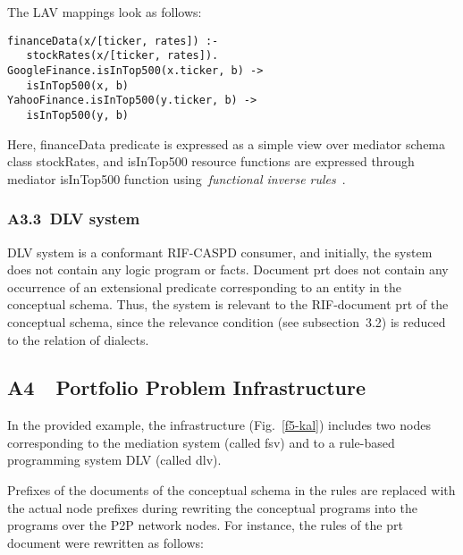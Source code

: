 \begin{multicols}{2}
{The  LAV mappings look as follows:
}



\noindent
{\small
  \begin{verbatim}
financeData(x/[ticker, rates]) :- 
   stockRates(x/[ticker, rates]).
GoogleFinance.isInTop500(x.ticker, b) -> 
   isInTop500(x, b)
YahooFinance.isInTop500(y.ticker, b) -> 
   isInTop500(y, b)
\end{verbatim}
}



{\small

\noindent
  Here, {\sf financeData} predicate is expressed as a simple view over mediator
schema class {\sf stockRates}, and {\sf isInTop500} resource functions are expressed
through mediator {\sf isInTop500} function using\ \textit{functional inverse
rules}~\cite{34-kal}.
}

{\small
\subsubsection*{A3.3\ DLV system}

\noindent
  DLV system is a conformant RIF-CASPD consumer, and initially, the system does
not contain any logic program or facts. Document {\sf prt} does not contain any
occurrence of an extensional predicate corresponding to an entity in the conceptual
schema. Thus, the system is relevant to the RIF-document {\sf prt} of the
conceptual schema, since the relevance condition (see subsection~3.2) is reduced to the
relation of dialects.
{

}

\subsection*{A4\ \ Portfolio Problem Infrastructure}

  \noindent
  In the provided example, the infrastructure (Fig.~\ref{f5-kal}) includes two nodes
corresponding to the mediation system (called {\sf fsv}) and to a rule-based
programming system DLV (called {\sf dlv}).



  Prefixes of the documents of the conceptual schema in the rules are replaced with
the actual node prefixes during rewriting  the conceptual programs into the
programs over the P2P network nodes. For instance, the rules of the {\sf prt} document
were rewritten as follows:
}
\end{multicols}

